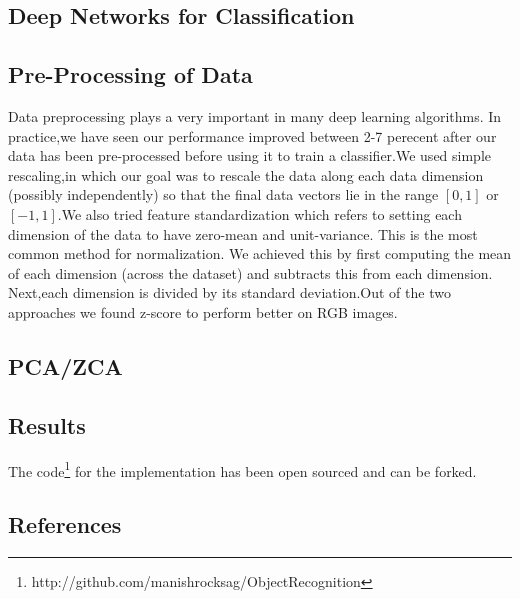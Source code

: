 \documentclass[11pt,twocolumn,letterpaper]{article}
\begin{document}
\subsection{Deep Networks for Classification}
\subsection{Pre-Processing of Data}
Data preprocessing plays a very important in many deep learning algorithms. In practice,we have seen our performance improved between 2-7 perecent after our data has been pre-processed before using it to train a classifier.We used simple rescaling,in which our goal was to rescale the data along each data dimension (possibly independently) so that the final data vectors lie in the range $[0, 1]$ or  $[-1, 1]$.We also tried feature standardization which refers to setting each dimension of the data to have zero-mean and unit-variance. This is the most common method for normalization. We achieved this by first computing the mean of each dimension (across the dataset) and subtracts this from each dimension. Next,each dimension is divided by its standard deviation.Out of the two approaches we found z-score to perform better on RGB images.
\subsection{PCA/ZCA}

\subsection{Results}
The code\footnote{http://github.com/manishrocksag/ObjectRecognition}
for the implementation has been open sourced and can be forked. 
\subsection{References}




\end{document}
